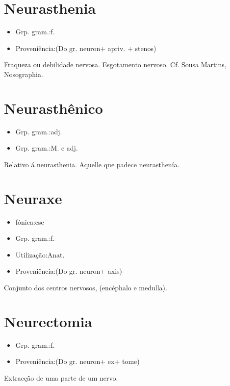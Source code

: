 \section{Neurasthenia}
\begin{itemize}
\item {Grp. gram.:f.}
\end{itemize}
\begin{itemize}
\item {Proveniência:(Do gr. \textunderscore neuron\textunderscore  + \textunderscore a\textunderscore  priv. + \textunderscore stenos\textunderscore )}
\end{itemize}
Fraqueza ou debilidade nervosa.
Esgotamento nervoso. Cf. Sousa Martins, \textunderscore Nosographia\textunderscore .
\section{Neurasthênico}
\begin{itemize}
\item {Grp. gram.:adj.}
\end{itemize}
\begin{itemize}
\item {Grp. gram.:M.  e  adj.}
\end{itemize}
Relativo á neurasthenia.
Aquelle que padece neurasthenía.
\section{Neuraxe}
\begin{itemize}
\item {fónica:cse}
\end{itemize}
\begin{itemize}
\item {Grp. gram.:f.}
\end{itemize}
\begin{itemize}
\item {Utilização:Anat.}
\end{itemize}
\begin{itemize}
\item {Proveniência:(Do gr. \textunderscore neuron\textunderscore  + \textunderscore axis\textunderscore )}
\end{itemize}
Conjunto dos centros nervosos, (encéphalo e medulla).
\section{Neurectomia}
\begin{itemize}
\item {Grp. gram.:f.}
\end{itemize}
\begin{itemize}
\item {Proveniência:(Do gr. \textunderscore neuron\textunderscore  + \textunderscore ex\textunderscore  + \textunderscore tome\textunderscore )}
\end{itemize}
Extracção de uma parte de um nervo.
